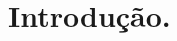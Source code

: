 \documentclass[
	article,			%
	11pt,				%
	oneside,			%
	a4paper,			%
	english,			%
	brazil,				%
	sumario=tradicional
	]{abntex2}
\begin{document}
\frenchspacing 




\imprimircapa

%
%
\maketitle


 
 \vspace{\onelineskip}
 
 \noindent



\tableofcontents*



\pagebreak

\textual
\section{\textbf{Introdução.}}
\end{document}
